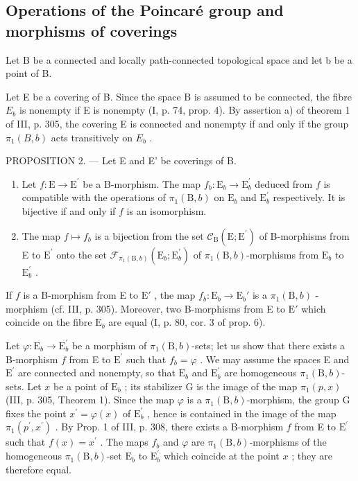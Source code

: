 \subsection{Operations of the Poincaré group and morphisms of coverings}

Let B be a connected and locally path-connected topological space and let b be a point of B.

Let E be a covering of B. Since the space B is assumed to be connected, the fibre \(E_{b}\) is nonempty if E is nonempty (I, p. 74, prop. 4). By assertion a) of theorem 1 of III, p. 305, the covering E is connected and nonempty if and only if the group \(\pi_{1}(B,b)\) acts transitively on \(E_{b}\) .

PROPOSITION 2. --- Let E and E' be coverings of B.

\begin{enumerate}
\def\labelenumi{\alph{enumi})}
\item
  Let \(f\colon\mathrm{E}\to\mathrm{E}^{\prime}\) be a B-morphism. The map \(f_{b}\colon\mathrm{E}_{b}\to\mathrm{E}_{b}^{\prime}\) deduced from \(f\) is compatible with the operations of \(\pi_{1}(\mathrm{B},b)\) on \(\mathrm{E}_{b}\) and \(\mathrm{E}_{b}^{\prime}\) respectively. It is bijective if and only if \(f\) is an isomorphism.
\item
  The map \(f\mapsto f_{b}\) is a bijection from the set \(\mathcal{C}_{\mathrm{B}}(\mathrm{E};\mathrm{E}^{\prime})\) of B-morphisms from E to \(\mathrm{E}^{\prime}\) onto the set \(\mathcal{F}_{\pi_1(\mathrm{B},b)}(\mathrm{E}_b;\mathrm{E}_b^{\prime})\) of \(\pi_1(\mathrm{B},b)\)-morphisms from \(\mathrm{E}_b\) to \(\mathrm{E}_b^{\prime}\) .
\end{enumerate}

If \(f\) is a B-morphism from E to \(\mathrm{E}'\) , the map \(f_b\colon \mathrm{E}_b\to \mathrm{E}_b'\) is a \(\pi_1(\mathrm{B},b)\) -morphism (cf. III, p. 305). Moreover, two B-morphisms from E to \(\mathrm{E}'\) which coincide on the fibre \(\mathrm{E}_b\) are equal (I, p. 80, cor. 3 of prop. 6).

Let \(\varphi\colon\mathrm{E}_{b}\to\mathrm{E}_{b}^{\prime}\) be a morphism of \(\pi_{1}(\mathrm{B},b)\)-sets; let us show that there exists a B-morphism \(f\) from E to \(\mathrm{E}^{\prime}\) such that \(f_{b}=\varphi\) . We may assume the spaces E and \(\mathrm{E}^{\prime}\) are connected and nonempty, so that \(\mathrm{E}_{b}\) and \(\mathrm{E}_{b}^{\prime}\) are homogeneous \(\pi_{1}(\mathrm{B},b)\)-sets. Let \(x\) be a point of \(\mathrm{E}_{b}\) ; its stabilizer G is the image of the map \(\pi_{1}(p,x)\) (III, p. 305, Theorem 1). Since the map \(\varphi\) is a \(\pi_{1}(\mathrm{B},b)\)-morphism, the group G fixes the point \(x^{\prime}=\varphi(x)\) of \(\mathrm{E}_{b}^{\prime}\) , hence is contained in the image of the map \(\pi_{1}(p^{\prime},x^{\prime})\) . By Prop. 1 of III, p. 308, there exists a B-morphism \(f\) from E to \(\mathrm{E}^{\prime}\) such that \(f(x)=x^{\prime}\) . The maps \(f_{b}\) and \(\varphi\) are \(\pi_{1}(\mathrm{B},b)\)-morphisms of the homogeneous \(\pi_{1}(\mathrm{B},b)\)-set \(\mathrm{E}_{b}\) to \(\mathrm{E}_{b}^{\prime}\) which coincide at the point \(x\) ; they are therefore equal.

